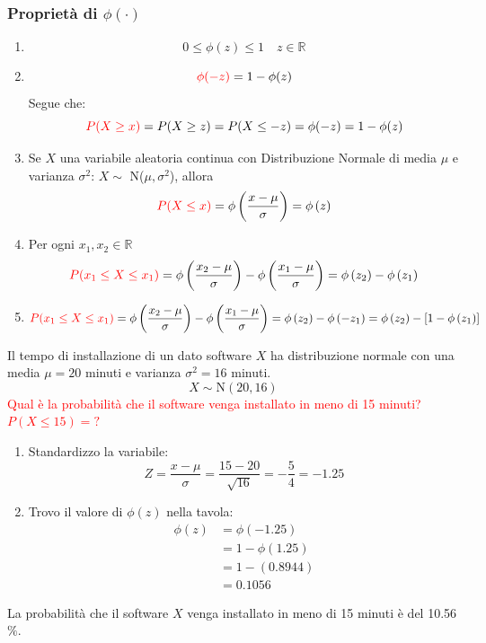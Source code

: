 \documentclass{article}  %
\theoremstyle{definition}
\begin{document}
\subsubsection{Proprietà di $\phi(\cdot)$}
\begin{enumerate}
	\item \[
		      0 \leq \phi(z) \leq 1 \quad z \in \mathbb{R}
	      \]
	\item \[
		      \textcolor{red}{\phi(-z)}=1-\phi(z)
	      \]
	      Segue che:
	      \[
		      \textcolor{red}{P(X \geq x)}=P(X \geq z)=P(X \leq -z)=\phi(-z)=1-\phi(z)
	      \]
	\item Se $X$ una variabile aleatoria continua con Distribuzione Normale di media $\mu$ e varianza $\sigma^2$: $X \sim$ N($\mu,\sigma^2$), allora
	      \[
		      \textcolor{red}{P(X \leq x)}=\phi\left(\frac{x-\mu}{\sigma}\right)=\phi\left(z\right)
	      \]
	\item Per ogni $x_1,x_2 \in \mathbb{R}$
	      \[
		      \textcolor{red}{P(x_1 \leq X \leq x_1)}=\phi\left(\frac{x_2-\mu}{\sigma}\right)-\phi\left(\frac{x_1-\mu}{\sigma}\right)=\phi\left(z_2\right)-\phi\left(z_1\right)
	      \]
	\item \[
		      \textcolor{red}{P(x_1 \leq X \leq x_1)}=\phi\left(\frac{x_2-\mu}{\sigma}\right)-\phi\left(\frac{x_1-\mu}{\sigma}\right)=\phi\left(z_2\right)-\phi\left(-z_1\right)=\phi\left(z_2\right)-\left[1-\phi\left(z_1\right)\right]
	      \]
\end{enumerate}
\begin{esercizio}[Esercizio:]
	Il tempo di installazione di un dato software $X$ ha distribuzione normale con una media $\mu=20$ minuti e varianza $\sigma^2=16$ minuti.
	\[
		X \sim \text{N}(20,16)
	\]
	\textcolor{red}{Qual è la probabilità che il software venga installato in meno di 15 minuti?$P(X \leq 15)=?$}
	\begin{enumerate}
		\item Standardizzo la variabile:
		      \[
			      Z = \frac{x-\mu}{\sigma}=\frac{15-20}{\sqrt{16}}=-\frac{5}{4}=-1.25
		      \]
		\item Trovo il valore di $\phi(z)$ nella tavola:
		      \begin{align*}
			      \phi(z)
			       & = \phi(-1.25)  \\
			       & = 1-\phi(1.25) \\
			       & = 1-(0.8944)   \\
			       & = 0.1056
		      \end{align*}
	\end{enumerate}
	La probabilità che il software $X$ venga installato in meno di 15 minuti è del 10.56$\%$.
\end{esercizio}
\end{document}
